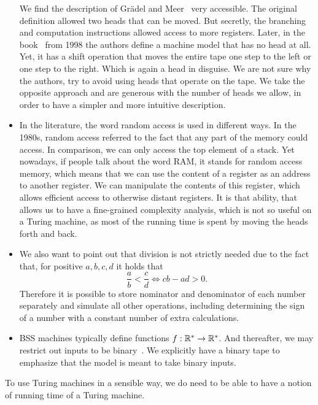 \documentclass{article}
\begin{document}
\begin{itemize}
        We find the description of Gr\"{a}del and Meer~\cite{GM95} very accessible.
        The original definition allowed two heads that can be moved.
        But secretly, the branching and computation instructions allowed access
        to more registers.
        Later, in the book~\cite{BCSS98} from 1998 the authors define a machine model that has no head at all.
        Yet, it has a shift operation that moves the entire tape one step to the left or one step to the right.
        Which is again a head in disguise.
        We are not sure why the authors, try to avoid using heads that operate on the tape.
        We take the opposite approach and are generous with the number of heads we allow,
        in order to have a simpler and more intuitive description.
    \item In the literature, the word random access is used in different ways.
        In the 1980s, random access referred to the fact that any part of the memory could access.
        In comparison, we can only access the top element of a stack.
        Yet nowadays, if people talk about the word RAM, it stands for random access memory,
        which means that we can use the content of a register as an address to another register.
        We can manipulate the contents of this register, which allows efficient access to otherwise distant registers. 
        It is that ability, that allows us to have a fine-grained complexity analysis,
        which is not so useful on a Turing machine, as most of the running time is spent by moving the heads forth and back.
    \item We also want to point out that division is not strictly needed due to the fact that, for positive $a,b,c,d$ it holds that
        \[\frac{a}{b} < \frac{c}{d} \Leftrightarrow cb - ad > 0.\]
        Therefore it is possible to store nominator and denominator of each number separately and simulate all other operations, including determining the sign of a number with a constant number of extra calculations. 
    \item BSS machines typically define functions $f : \mathbb{R}^* \rightarrow \mathbb{R}^*$. 
        And thereafter, we may restrict out inputs to be binary~\cite{BC09}. 
        We explicitly have a binary tape to emphasize that 
        the model is meant to take binary inputs.
\end{itemize}

To use Turing machines in a sensible way, we do need to be able 
to have a notion of running time of a Turing machine.
\end{document}
